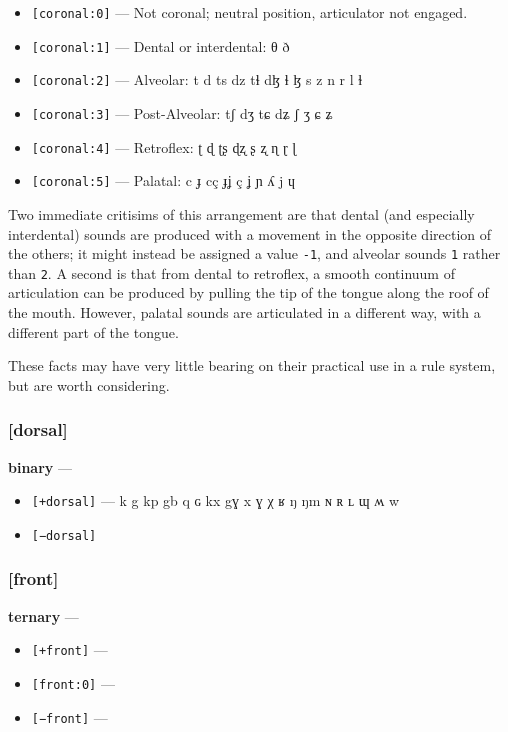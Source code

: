 \documentclass[10pt,letterpaper]{article}
\begin{document}
\begin{itemize}
  \item \texttt{[coronal:0]} — Not coronal; neutral position, articulator not engaged.
  \item \texttt{[coronal:1]} — Dental or interdental: θ ð 
  \item \texttt{[coronal:2]} — Alveolar: t d ts dz tɬ dɮ ɬ ɮ s z n r l ɫ 
  \item \texttt{[coronal:3]} — Post-Alveolar: tʃ dʒ tɕ dʑ ʃ ʒ ɕ ʑ 
  \item \texttt{[coronal:4]} — Retroflex: ʈ ɖ ʈʂ ɖʐ ʂ ʐ ɳ ɽ ɭ 
  \item \texttt{[coronal:5]} — Palatal: c ɟ cç ɟʝ ç ʝ ɲ ʎ j ɥ
\end{itemize}

Two immediate critisims of this arrangement  are that dental (and especially interdental) sounds are produced with a movement in the opposite direction of the others; it might instead be assigned a value \texttt{-1}, and alveolar sounds \texttt{1} rather than \texttt{2}. A second is that from dental to retroflex, a smooth continuum of articulation can be produced by pulling the tip of the tongue along the roof of the mouth. However, palatal sounds are articulated in a different way, with a different part of the tongue.

These facts may have very little bearing on their practical use in a rule system, but are worth considering.

\subsubsection{[dorsal]}
\label{ssub:feature_dorsal}
\textbf{binary} — 

\begin{itemize}
\item \texttt{[+dorsal]} — k g kp gb q ɢ kx gɣ x ɣ χ ʁ ŋ ŋm ɴ ʀ ʟ ɰ ʍ w 
\item \texttt{[−dorsal]}
\end{itemize}

\subsubsection{[front]}
\label{ssub:feature_front}
\textbf{ternary} — 

\begin{itemize}
\item \texttt{[+front]} — 
\item \texttt{[front:0]} — 
\item \texttt{[−front]} — 
\end{itemize}
\end{document}
